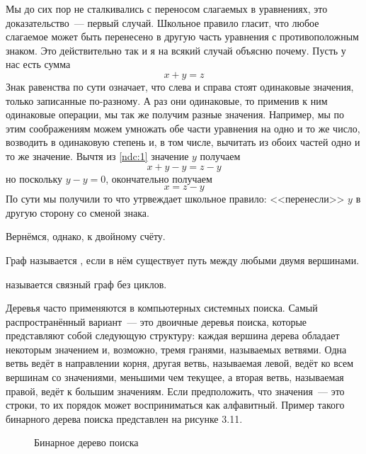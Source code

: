 Мы до сих пор не сталкивались с переносом слагаемых в уравнениях, это доказательство~--- первый случай. Школьное правило гласит, что любое слагаемое может быть перенесено в другую часть уравнения с противоположным знаком. Это действительно так и я на всякий случай объясню почему. Пусть у нас есть сумма
\begin{equation}\label{ndc:1}
x+y = z
\end{equation}
Знак равенства по сути означает, что слева и справа стоят одинаковые значения, только записанные по-разному. А раз они одинаковые, то применив к ним одинаковые операции, мы так же получим разные значения. Например, мы по этим соображениям можем умножать обе части уравнения на одно и то же число, возводить в одинаковую степень и, в том числе, вычитать из обоих частей одно и то же значение. Вычтя из \eqref{ndc:1} значение $y$ получаем
$$x + y - y = z - y$$
но поскольку $y-y=0$, окончательно получаем
$$x = z - y$$
По сути мы получили то что утрвеждает школьное правило: <<перенесли>> $y$ в другую сторону со сменой знака.

Вернёмся, однако, к двойному счёту.

\begin{definition}
Граф называется , если в нём существует путь между любыми двумя вершинами.
\end{definition}

\begin{definition}
 называется связный граф без циклов.
\end{definition}

Деревья часто применяются в компьютерных системных поиска. Самый распространённый вариант~--- это двоичные деревья поиска, которые представляют собой следующую структуру: каждая вершина дерева обладает некоторым значением и, возможно, тремя гранями, называемых ветвями. Одна ветвь ведёт в направлении корня, другая ветвь, называемая левой, ведёт ко всем вершинам со значениями, меньшими чем текущее, а вторая ветвь, называемая правой, ведёт к большим значениям. Если предположить, что значения~--- это строки, то их порядок может восприниматься как алфавитный. Пример такого бинарного дерева поиска представлен на рисунке 3.11.


\begin{figure}[h]
\centering
{}
\caption{Бинарное дерево поиска}
\end{figure}

